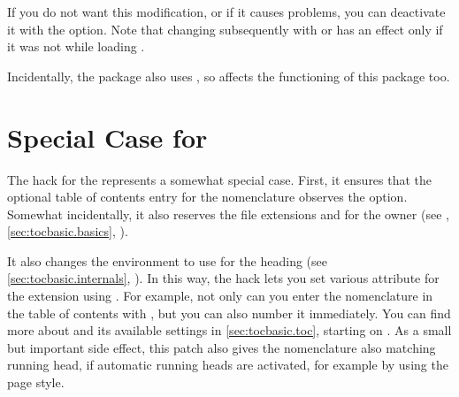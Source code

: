 If you do not want this modification, or if it causes problems, you can
deactivate it with the
option. Note that changing  subsequently
with  or
 has an effect only
if it was not  while loading .

Incidentally, the 
package also uses , so  affects the
functioning of this package too.%


\section{Special Case for }
\label{sec:nomencl}

The hack for the
 represents a somewhat
special case. First, it ensures that the optional table of contents entry for
the nomenclature observes the 
option. Somewhat incidentally, it also reserves the file extensions 
and  for the owner  (see
, \autoref{sec:tocbasic.basics},
).

It also changes the 
environment to use
 for the
heading (see \autoref{sec:tocbasic.internals},
). In this way, the hack lets you
set various attribute for the  extension using
%
. For example, not only can you
enter the nomenclature in the table of contents with
, but you
can also number it immediately. You can find more about
 and its available settings in
\autoref{sec:tocbasic.toc}, starting on . 
As a small but important side effect, this patch also gives the nomenclature
also matching running head, if automatic running heads are activated, for
example by using the  page style.

